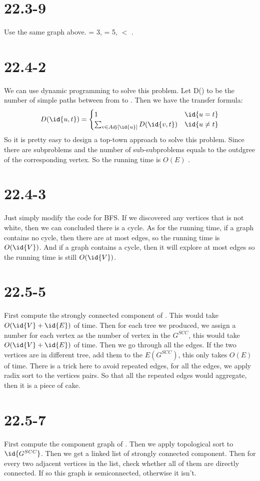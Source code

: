 \documentclass[a4paper]{article}
\begin{document}
 \section*{22.3-9}
 Use the same graph above.  = 3,  = 5,
   $<$ .

\section*{22.4-2}
We can use dynamic programming to solve this problem. Let
D() to be the number of simple paths between from
 to . Then we have the transfer formula:\\
$$D(\id{u,t}) =
\begin{cases}
1& \id{u = t} \\
\sum_{v\in Adj[\id{u}]} D(\id{v,t})& \id{u \not= t}

\end{cases}$$
So it is pretty easy to design a top-town approach to solve
this problem. Since there are  subproblems and the number
of sub-subproblems equals to the outdgree of the corresponding
vertex. So the running time is $O(E)$ .
\section*{22.4-3}
Just simply modify the code for BFS. If we discovered any vertices that
is not white, then we can concluded there is a cycle. As for the
running time, if a graph contains no cycle, then there are at most
 edges, so the running time is $O(\id{V})$. And if a graph
contains a cycle, then it will explore at most  edges so the
running time is still $O(\id{V})$.
\section*{22.5-5}
First compute the strongly connected component of . This would
take $O(\id{V}+\id{E})$ of time. Then for each tree we produced, we assign
a number for each vertex as the number of vertex in the $G^{SCC}$, this would take $O(\id{V}+\id{E})$ of time. Then we
go through all the edges. If the two vertices are in different tree, add them to
the $E(G^{SCC})$, this only takes $O(E)$ of time. There is a trick here to avoid repeated edges,
for all the edges, we apply radix sort to the vertices pairs. So that all the repeated edges would aggregate, then it is a piece of cake. 
\section*{22.5-7}
First compute the component graph of . Then we apply topological sort to $\id{G^{SCC}}$.
Then we get a linked list of strongly connected component. Then for every two adjacent vertices in the list,
check whether all of them are directly connected. If so this graph is semiconnected, otherwise it isn't.
\end{document}
